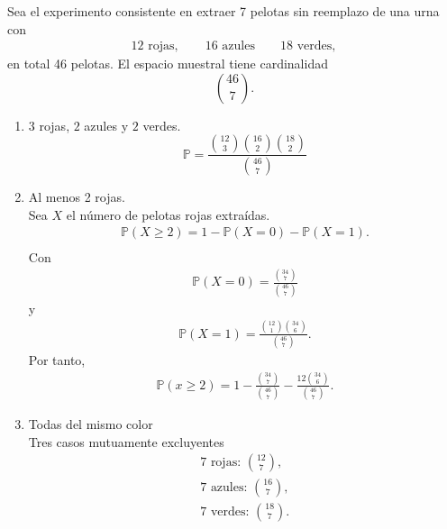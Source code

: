 \documentclass[12pt,a4paper]{article}
\begin{document}
    \begin{solucion}
        Sea el experimento consistente en extraer 7 pelotas sin reemplazo de una urna con
        \begin{align*}
            12\text{ rojas},\qquad16\text{ azules}\qquad18\text{ verdes},
        \end{align*}
        en total 46 pelotas. El espacio muestral tiene cardinalidad
        \begin{equation*}
            \binom{46}{7}.
        \end{equation*}
        \begin{enumerate}
            \item[(a)] $3$ rojas, $2$ azules y $2$ verdes.
            \begin{equation*}
                \mathbb{P}=\frac{\binom{12}{3}\binom{16}{2}\binom{18}{2}}{\binom{46}{7}}
            \end{equation*}
            \item[(b)] Al menos 2 rojas.\\
            Sea $X$ el número de pelotas rojas extraídas.
            \begin{align*}
                \mathbb{P}(X\geq2)=1-\mathbb{P}(X=0)-\mathbb{P}(X=1).\\
            \end{align*}
            Con
            \begin{align*}
                \mathbb{P}(X=0)=\frac{\binom{34}{7}}{\binom{46}{7}}
            \end{align*}
            y
            \begin{align*}
                \mathbb{P}(X=1)=\frac{\binom{12}{1}\binom{34}{6}}{\binom{46}{7}}.
            \end{align*}
            Por tanto,
            \begin{align*}
                \mathbb{P}(x\geq2)=1-\frac{\binom{34}{7}}{\binom{46}{7}}-\frac{12\binom{34}{6}}{\binom{46}{7}}.
            \end{align*}
            \item[(c)] Todas del mismo color\\
            Tres casos mutuamente excluyentes
            \begin{align*}
                7\text{ rojas: }\binom{12}{7},\\
                7\text{ azules: }\binom{16}{7},\\
                7\text{ verdes: }\binom{18}{7}.
            \end{align*}

\end{enumerate}
\end{solucion}
\end{document}
